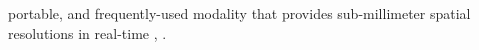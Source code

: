 portable, and
frequently-used modality that provides
sub-millimeter spatial resolutions in
real-time
\cite[Fig. 1.15, Table 1.2]{book:Szabo2013},
\cite{article:BierigJDMS2009}.
